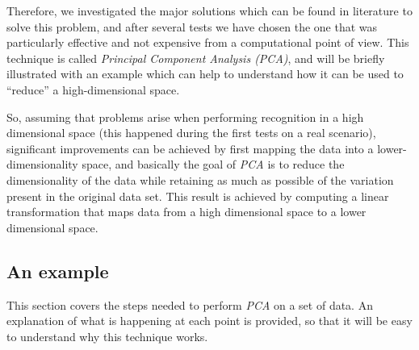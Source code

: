 \documentclass[12pt,a4paper,cucitura]{toptesi}
\begin{document}
Therefore, we investigated the major solutions which can be found in literature to solve this problem, and after several tests we have chosen the one that was particularly effective and not expensive from a computational point of view. This technique is called \emph{Principal Component Analysis (PCA)}, and will be briefly illustrated with an example which can help to understand how it can be used to ``reduce'' a high-dimensional space.

So, assuming that problems arise when performing recognition in a high dimensional space (this happened during the first tests on a real scenario), significant improvements can be achieved by first mapping the data into a lower-dimensionality space, and basically the goal of \emph{PCA} is to reduce the dimensionality of the data while retaining as
much as possible of the variation present in the original data set.
This result is achieved by computing a linear transformation that maps data from a high dimensional space to a lower dimensional space.

\subsection{An example}
This section covers the steps needed to perform \emph{PCA} on a set of data. 
An explanation of what is happening at each point is provided, so that it will be easy to understand why this technique works.
\end{document}
